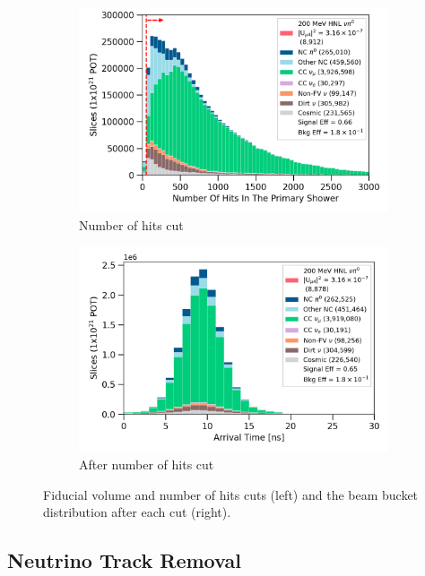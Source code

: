 \begin{figure}[htb]
\begin{subfigure}[b]{0.495\textwidth}
            \includegraphics[width=\textwidth]{nHits}
            \caption{Number of hits cut}%
            \label{fig:Nhits_cut}
        \end{subfigure}
        \hfill
        \begin{subfigure}[b]{0.495\textwidth}   
            \centering 
            \includegraphics[width=\textwidth]{beam_bucket_postNhits}
            \caption{After number of hits cut}%
            \label{fig:bb_postNhits}
        \end{subfigure}
        \caption{
		Fiducial volume and number of hits cuts (left) and the beam bucket distribution after each cut (right). 
	}
        \label{fig:quality_cut}
\end{figure}

\subsection{Neutrino Track Removal}
\label{sec:trk_cut}

